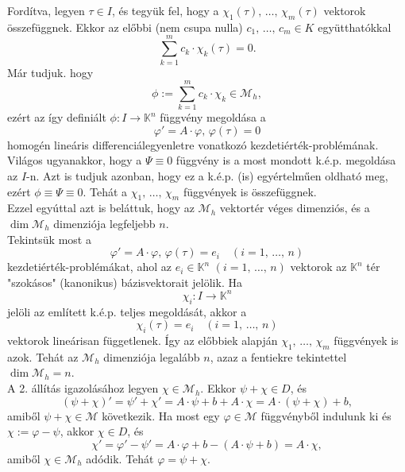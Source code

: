 \documentclass{article}
\newcommand{\K}{\mathbb{K}}
\begin{document}
	Fordítva, legyen $\tau \in I$, és tegyük fel, hogy a $\chi_1(\tau), \, \dots, \, \chi_m(\tau)$ vektorok összefüggnek. Ekkor az előbbi (nem csupa nulla) $c_1, \, \dots, \, c_m \in K$ együtthatókkal
	\[
		\sum_{k=1}^m c_k \cdot \chi_k(\tau) = 0.
	\]
	Már tudjuk. hogy
	\[
		\phi := \sum_{k=1}^m c_k \cdot \chi_k \in \mathcal{M}_h,
	\]
	ezért az így definiált $\phi : I \to \K^n$ függvény megoldása a
	\[
		\varphi' = A \cdot \varphi, \, \varphi(\tau) = 0
	\]
	homogén lineáris differenciálegyenletre vonatkozó kezdetiérték-problémának. Világos ugyanakkor, hogy a $\Psi \equiv 0$ függvény is a most mondott k.é.p. megoldása az $I$-n. Azt is tudjuk azonban, hogy ez a k.é.p. (is) egyértelműen oldható meg, ezért $\phi \equiv \Psi \equiv 0$. Tehát a $\chi_1, \, \dots, \, \chi_m$ függvények is összefüggnek.\\
	
	Ezzel egyúttal azt is beláttuk, hogy az $\mathcal{M}_h$ vektortér véges dimenziós, és a $\dim \mathcal{M}_h$ dimenziója legfeljebb $n$.\\
	
	Tekintsük most a 
	\[
		\varphi' = A \cdot \varphi, \, \varphi(\tau) = e_i \quad (i = 1, \, \dots, \, n)
	\]
	kezdetiérték-problémákat, ahol az $e_i \in \K^n$ $(i = 1, \, \dots, \, n)$ vektorok az $\K^n$ tér "szokásos" (kanonikus) bázisvektorait jelölik. Ha
	\[
		\chi_i : I \to \K^n
	\]
	jelöli az említett k.é.p. teljes megoldását, akkor a
	\[
		\chi_i(\tau) = e_i \quad (i = 1, \, \dots, \, n)
	\]
	vektorok lineárisan függetlenek. Így az előbbiek alapján $\chi_1, \, \dots, \, \chi_m$ függvények is azok. Tehát az $\mathcal{M}_h$ dimenziója legalább $n$, azaz a fentiekre tekintettel $\dim \mathcal{M}_h = n$.\\
	
	A 2. állítás igazolásához legyen $\chi \in \mathcal{M}_h$. Ekkor $\psi + \chi \in D$, és
	\[
		(\psi + \chi)' = \psi' + \chi' = A \cdot \psi + b + A \cdot \chi = A \cdot (\psi + \chi) + b,
	\]
	amiből $\psi + \chi \in \mathcal{M}$ következik. Ha most egy $\varphi \in \mathcal{M}$ függvényből indulunk ki és $\chi := \varphi - \psi$, akkor $\chi \in D$, és
	\[
		\chi' = \varphi' - \psi' = A \cdot \varphi + b - (A \cdot \psi + b) = A \cdot \chi,
	\]
	amiből $\chi \in \mathcal{M}_h$ adódik. Tehát $\varphi = \psi + \chi$.\\
	
\end{document}

